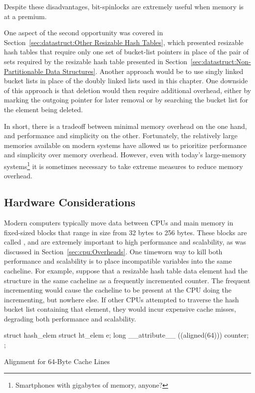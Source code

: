 Despite these disadvantages, bit-spinlocks are extremely useful when
memory is at a premium.

One aspect of the second opportunity was covered in
Section~\ref{sec:datastruct:Other Resizable Hash Tables},
which presented resizable hash tables that require only one
set of bucket-list pointers in place of the pair of sets required
by the resizable hash table presented in
Section~\ref{sec:datastruct:Non-Partitionable Data Structures}.
Another approach would be to use singly linked bucket lists in
place of the doubly linked lists used in this chapter.
One downside of this approach is that deletion would then require
additional overhead, either by marking the outgoing pointer
for later removal
or by searching the bucket list for the element being deleted.

In short, there is a tradeoff between minimal memory overhead on
the one hand, and performance and simplicity on the other.
Fortunately, the relatively large memories available on modern
systems have allowed us to prioritize performance and simplicity
over memory overhead.
However, even with today's large-memory systems\footnote{
	Smartphones with gigabytes of memory, anyone?}
it is sometimes necessary to take extreme measures to reduce
memory overhead.

\subsection{Hardware Considerations}
\label{sec:datastruct:Hardware Considerations}

Modern computers typically move data between CPUs and main memory in
fixed-sized blocks that range in size from 32 bytes to 256 bytes.
These blocks are called \emph{}, and are extremely important
to high performance and scalability, as was discussed in
Section~\ref{sec:cpu:Overheads}.
One timeworn way to kill both performance and scalability is to
place incompatible variables into the same cacheline.
For example, suppose that a resizable hash table data element had
the  structure in the same cacheline as a frequently incremented
counter.
The frequent incrementing would cause the cacheline to be present at
the CPU doing the incrementing, but nowhere else.
If other CPUs attempted to traverse the hash bucket list containing
that element, they would incur expensive cache misses, degrading both
performance and scalability.

\begin{listing}
\begin{VerbatimL}
struct hash_elem {
	struct ht_elem e;
	long __attribute__ ((aligned(64))) counter;
};
\end{VerbatimL}
\caption{Alignment for 64-Byte Cache Lines}
\label{lst:datastruct:Alignment for 64-Byte Cache Lines}
\end{listing}

